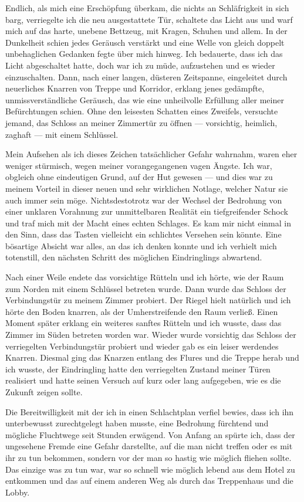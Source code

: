 Endlich, als mich eine Erschöpfung überkam, die nichts an Schläfrigkeit in sich barg, verriegelte ich die neu ausgestattete Tür, schaltete das Licht aus und warf mich auf das harte, unebene Bettzeug, mit Kragen, Schuhen und allem. In der Dunkelheit schien jedes Geräusch verstärkt und eine Welle von gleich doppelt unbehaglichen Gedanken fegte über mich hinweg. Ich bedauerte, dass ich das Licht abgeschaltet hatte, doch war ich zu müde, aufzustehen und es wieder einzuschalten. Dann, nach einer langen, düsteren Zeitspanne, eingeleitet durch neuerliches Knarren von Treppe und Korridor, erklang jenes gedämpfte, unmissverständliche Geräusch, das wie eine unheilvolle Erfüllung aller meiner Befürchtungen schien. Ohne den leisesten Schatten eines Zweifels, versuchte jemand, das Schloss an meiner Zimmertür zu öffnen --- vorsichtig, heimlich, zaghaft --- mit einem Schlüssel.

Mein Aufsehen als ich dieses Zeichen tatsächlicher Gefahr wahrnahm, waren eher weniger stürmisch, wegen meiner vorangegangenen vagen Ängste. Ich war, obgleich ohne eindeutigen Grund, auf der Hut gewesen --- und dies war zu meinem Vorteil in dieser neuen und sehr wirklichen Notlage, welcher Natur sie auch immer sein möge. Nichtsdestotrotz war der Wechsel der Bedrohung von einer unklaren Vorahnung zur unmittelbaren Realität ein tiefgreifender Schock und traf mich mit der Macht eines echten Schlages. Es kam mir nicht einmal in den Sinn, dass das Tasten vielleicht ein schlichtes Versehen sein könnte. Eine bösartige Absicht war alles, an das ich denken konnte und ich verhielt mich totenstill, den nächsten Schritt des möglichen Eindringlings abwartend.

Nach einer Weile endete das vorsichtige Rütteln und ich hörte, wie der Raum zum Norden mit einem Schlüssel betreten wurde. Dann wurde das Schloss der Verbindungstür zu meinem Zimmer probiert. Der Riegel hielt natürlich und ich hörte den Boden knarren, als der Umherstreifende den Raum verließ. Einen Moment später erklang ein weiteres sanftes Rütteln und ich wusste, dass das Zimmer im Süden betreten worden war. Wieder wurde vorsichtig das Schloss der verriegelten Verbindungstür probiert und wieder gab es ein leiser werdendes Knarren. Diesmal ging das Knarzen entlang des Flures und die Treppe herab und ich wusste, der Eindringling hatte den verriegelten Zustand meiner Türen realisiert und hatte seinen Versuch auf kurz oder lang aufgegeben, wie es die Zukunft zeigen sollte.

Die Bereitwilligkeit mit der ich in einen Schlachtplan verfiel bewies, dass ich ihn unterbewusst zurechtgelegt haben musste, eine Bedrohung fürchtend und mögliche Fluchtwege seit Stunden erwägend. Von Anfang an spürte ich, dass der ungesehene Fremde eine Gefahr darstellte, auf die man nicht treffen oder es mit ihr zu tun bekommen, sondern vor der man so hastig wie möglich fliehen sollte. Das einzige was zu tun war, war so schnell wie möglich lebend aus dem Hotel zu entkommen und das  auf einem anderen Weg als durch das Treppenhaus und die Lobby.

